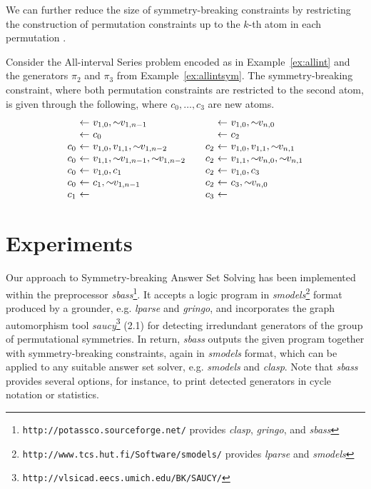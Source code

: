 \documentclass[envcountsame]{llncs}
\newcommand{\systemname}[1]{\emph{#1}}
\newcommand{\dneg}[0]{\sim\!\!}
\begin{document}
We can further reduce the size of symmetry-breaking constraints by restricting the construction of permutation constraints up to the $k$-th atom in each permutation \cite{almasa03a}.
\begin{example}
Consider the All-interval Series problem encoded as in Example~\ref{ex:allint} and the generators $\pi_2$ and $\pi_3$ from Example~\ref{ex:allintsym}.
The symmetry-breaking constraint, where both permutation constraints are restricted to the second atom, is given through the following, where $c_0, \dots, c_3$ are new atoms.
\[
\begin{array}{r@{\ \leftarrow\ }l@{\qquad}r@{\ \leftarrow\ }l}
& v_{1,0}, \dneg v_{1,n-1}                      & & v_{1,0}, \dneg v_{n,0} \\
& c_0                                           & & c_2\\
c_0 & v_{1,0}, v_{1,1}, \dneg v_{1,n-2}         & c_2 & v_{1,0}, v_{1,1}, \dneg v_{n,1} \\
c_0 & v_{1,1}, \dneg v_{1,n-1}, \dneg v_{1,n-2} & c_2 & v_{1,1}, \dneg v_{n,0}, \dneg v_{n,1}\\
c_0 & v_{1,0}, c_1                              & c_2 & v_{1,0}, c_3 \\
c_0 & c_1, \dneg v_{1,n-1}                      & c_2 & c_3, \dneg v_{n,0}\\
c_1 &                                           & c_3 & \\
\end{array}
\]
\end{example}

\section{Experiments \label{sec:exp}}
Our approach to Symmetry-breaking Answer Set Solving has been implemented within the preprocessor \systemname{sbass}\footnote{\texttt{http://potassco.sourceforge.net/} provides \systemname{clasp}, \systemname{gringo}, and \systemname{sbass}}. It accepts a logic program in \systemname{smodels}\footnote{\texttt{http://www.tcs.hut.fi/Software/smodels/} provides \systemname{lparse} and \systemname{smodels}} format~\cite{lparseManual} produced by a grounder, e.g. \systemname{lparse} and \systemname{gringo}, and incorporates the graph automorphism tool \systemname{saucy}\footnote{\texttt{http://vlsicad.eecs.umich.edu/BK/SAUCY/}} (2.1) for detecting irredundant generators of the group of permutational symmetries. In return, \systemname{sbass} outputs the given program together with symmetry-breaking constraints, again in \systemname{smodels} format, which can be applied to any suitable answer set solver, e.g. \systemname{smodels} and \systemname{clasp}. Note that \emph{sbass} provides several options, for instance, to print detected generators in cycle notation or statistics.
\end{document}
